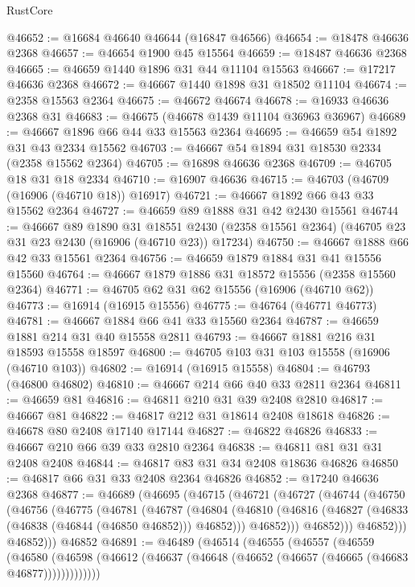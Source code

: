 \begin{lexlean}{RustCore}
\begin{coremodule}
@46652 := @16684 @46640 @46644 (@16847 @46566)
@46654 := @18478 @46636 @2368
@46657 := @46654 @1900 @45 @15564
@46659 := @18487 @46636 @2368
@46665 := @46659 @1440 @1896 @31 @44 @11104 @15563
@46667 := @17217 @46636 @2368
@46672 := @46667 @1440 @1898 @31 @18502 @11104
@46674 := @2358 @15563 @2364
@46675 := @46672 @46674
@46678 := @16933 @46636 @2368 @31
@46683 := @46675 (@46678 @1439 @11104 @36963 @36967)
@46689 := @46667 @1896 @66 @44 @33 @15563 @2364
@46695 := @46659 @54 @1892 @31 @43 @2334 @15562
@46703 := @46667 @54 @1894 @31 @18530 @2334 (@2358 @15562 @2364)
@46705 := @16898 @46636 @2368
@46709 := @46705 @18 @31 @18 @2334
@46710 := @16907 @46636
@46715 := @46703 (@46709 (@16906 (@46710 @18)) @16917)
@46721 := @46667 @1892 @66 @43 @33 @15562 @2364
@46727 := @46659 @89 @1888 @31 @42 @2430 @15561
@46744 := @46667
    @89
    @1890
    @31
    @18551
    @2430
    (@2358 @15561 @2364)
    (@46705 @23 @31 @23 @2430 (@16906 (@46710 @23)) @17234)
@46750 := @46667 @1888 @66 @42 @33 @15561 @2364
@46756 := @46659 @1879 @1884 @31 @41 @15556 @15560
@46764 := @46667 @1879 @1886 @31 @18572 @15556 (@2358 @15560 @2364)
@46771 := @46705 @62 @31 @62 @15556 (@16906 (@46710 @62))
@46773 := @16914 (@16915 @15556)
@46775 := @46764 (@46771 @46773)
@46781 := @46667 @1884 @66 @41 @33 @15560 @2364
@46787 := @46659 @1881 @214 @31 @40 @15558 @2811
@46793 := @46667 @1881 @216 @31 @18593 @15558 @18597
@46800 := @46705 @103 @31 @103 @15558 (@16906 (@46710 @103))
@46802 := @16914 (@16915 @15558)
@46804 := @46793 (@46800 @46802)
@46810 := @46667 @214 @66 @40 @33 @2811 @2364
@46811 := @46659 @81
@46816 := @46811 @210 @31 @39 @2408 @2810
@46817 := @46667 @81
@46822 := @46817 @212 @31 @18614 @2408 @18618
@46826 := @46678 @80 @2408 @17140 @17144
@46827 := @46822 @46826
@46833 := @46667 @210 @66 @39 @33 @2810 @2364
@46838 := @46811 @81 @31 @31 @2408 @2408
@46844 := @46817 @83 @31 @34 @2408 @18636 @46826
@46850 := @46817 @66 @31 @33 @2408 @2364 @46826
@46852 := @17240 @46636 @2368
@46877 := @46689
    (@46695
      (@46715
        (@46721
          (@46727
            (@46744
              (@46750
                (@46756
                  (@46775
                    (@46781
                      (@46787
                        (@46804
                          (@46810
                            (@46816 (@46827 (@46833 (@46838 (@46844 (@46850 @46852))) @46852)))
                            @46852)))
                      @46852)))
                @46852)))
          @46852)))
    @46852
@46891 := @46489
    (@46514
      (@46555
        (@46557
          (@46559
            (@46580
              (@46598 (@46612 (@46637 (@46648 (@46652 (@46657 (@46665 (@46683 @46877)))))))))))))

\end{coremodule}
\end{lexlean}
